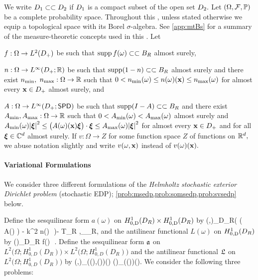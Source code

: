 We write $D_{1} \subset\subset D_{2}$ if $D_{1}$ is a compact subset of the open set $D_{2}.$ Let $\OFP$ be a complete probability space. Throughout this , unless stated otherwise we equip a topological space with its Borel $\sigma$-algebra. See \cref{app:mtBs} for a summary of the measure-theoretic concepts used in this . Let
\bit
\item $f:\Omega\rightarrow\LtDp$ be such that $\operatorname{supp} f(\omega) \subset\subset B_{R}$ almost surely,
\item $n:\Omega\rightarrow \LiDpRR$ be such that $\operatorname{supp}(1-n) \subset\subset B_{R}$ almost surely and there exist $n_{\min},$ $n_{\max}:\Omega\rightarrow \mathbb R$ such that
$0 < n_{\min}(\omega) \leq n(\omega)(\mathbf{x}) \leq n_{\max}(\omega)$
for almost every $\mathbf{x} \in D_{+}$ almost surely, and
\item $A:\Omega\rightarrow\LiDpRRdtd$ be such that $\operatorname{supp}(I-A) \subset\subset B_{R}$ and there exist $A_{\min},A_{\max}:\Omega \rightarrow \mathbb R$ such that $0 < A_{\min}(\omega) < A_{\max}(\omega)$ almost surely and
$\Amin(\omega)\abs{\bxi}^2 \leq \big(A(\omega)(\bx)\bxi\big)\cdot\bxi \leq \Amax(\omega)\abs{\bxi}^2$
for almost every $\mathbf{x} \in D_{+}$ and for all $\boldsymbol{\xi} \in \mathbb C^{d}$ almost surely.
\eit
If $v:\Omega \rightarrow Z$ for some function space $Z$ of functions on $\mathbb R^{d},$ we abuse notation slightly and write $v(\omega,\mathbf{x})$ instead of $v(\omega)(\mathbf{x}).$


%

\paragraph{Variational Formulations} We consider three different formulations of the  \emph{Helmholtz stochastic exterior Dirichlet problem} (stochastic EDP); \cref{prob:msedp,prob:somsedp,prob:svsedp} below.

Define the sesquilinear form $a(\omega)$ on $\HozDDR \times \HozDDR$ by
\beq\label{eq:SEDPa}
\mleft(\vo,\vt\mright)\de\int_{D_R}\Big( \mleft( A(\omega) \grad \vo\mright)\cdot \grad \vtb 
 - k^2 n(\omega)\, \vo\,\vtb \Big)\dd\Leb- \big\langle T_R \gamma \vo,\gamma \vt\big\rangle_{\Gamma_R},
 \eeq
 and the antilinear functional $L(\omega)$ on $\HozDDR$ by
\beq\label{eq:SEDPL}
(\vt)\de \int_{D_R} f(\omega)\, \vtb\,\dd\Leb.
\eeq
Define the sesquilinear form $\mathfrak{a}$ on $L^2\big(\Omega;H_{0,D}^1(D_R)\big)\times L^2\big(\Omega;H_{0,D}^1(D_R)\big)$ and the antilinear functional $\mathfrak{L}$ on $L^2\big(\Omega;H_{0,D}^1(D_R)\big)$ by 
\beq\label{eq:SEDPas}
\as\mleft(\vo,\vt\mright)\de \int_\Omega {}\mleft(\vo(\omega),\vt(\omega)\mright)\dd\PP(\omega)
\quad{} \quad
%
\Ls(\vt)\de \int_\Omega {}\mleft(\vt(\omega)\mright)\dd\PP(\omega).
\eeq
We consider the following three problems:

